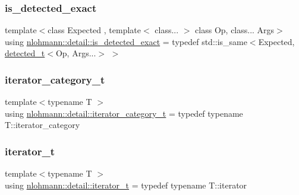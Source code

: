 \subsubsection{\texorpdfstring{is\_detected\_exact}{is\_detected\_exact}}
{\footnotesize\ttfamily template$<$class Expected , template$<$ class... $>$ class Op, class... Args$>$ \\
using \mbox{\hyperlink{namespacenlohmann_1_1detail_a7542b4dbac07817fd4849ecfa4619def}{nlohmann\+::detail\+::is\+\_\+detected\+\_\+exact}} = typedef std\+::is\+\_\+same$<$Expected, \mbox{\hyperlink{namespacenlohmann_1_1detail_a37e97a32d0b94ce5f745427e4e40204d}{detected\+\_\+t}}$<$Op, Args...$>$ $>$}

\mbox{\label{namespacenlohmann_1_1detail_ad22d2aa3aab018050ae519f6754366e1}} 
\subsubsection{\texorpdfstring{iterator\_category\_t}{iterator\_category\_t}}
{\footnotesize\ttfamily template$<$typename T $>$ \\
using \mbox{\hyperlink{namespacenlohmann_1_1detail_ad22d2aa3aab018050ae519f6754366e1}{nlohmann\+::detail\+::iterator\+\_\+category\+\_\+t}} = typedef typename T\+::iterator\+\_\+category}

\mbox{\label{namespacenlohmann_1_1detail_a9ff93db146174305bce1bc4c54703e11}} 
\subsubsection{\texorpdfstring{iterator\_t}{iterator\_t}}
{\footnotesize\ttfamily template$<$typename T $>$ \\
using \mbox{\hyperlink{namespacenlohmann_1_1detail_a9ff93db146174305bce1bc4c54703e11}{nlohmann\+::detail\+::iterator\+\_\+t}} = typedef typename T\+::iterator}

\mbox{\label{namespacenlohmann_1_1detail_a44869ca9f422b260625d78e4e8121559}} 
